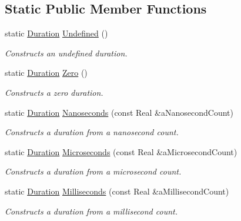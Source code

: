 \subsection*{Static Public Member Functions}
\begin{DoxyCompactItemize}
\item 
static \hyperlink{classostk_1_1physics_1_1time_1_1_duration}{Duration} \hyperlink{classostk_1_1physics_1_1time_1_1_duration_a568046182c0bc460b7e93de8b4084768}{Undefined} ()
\begin{DoxyCompactList}\small\item\em Constructs an undefined duration. \end{DoxyCompactList}\item 
static \hyperlink{classostk_1_1physics_1_1time_1_1_duration}{Duration} \hyperlink{classostk_1_1physics_1_1time_1_1_duration_acacd92afc598a3a48289307337fce217}{Zero} ()
\begin{DoxyCompactList}\small\item\em Constructs a zero duration. \end{DoxyCompactList}\item 
static \hyperlink{classostk_1_1physics_1_1time_1_1_duration}{Duration} \hyperlink{classostk_1_1physics_1_1time_1_1_duration_a81e8036be5cf9ee2f0108ac955642c96}{Nanoseconds} (const Real \&a\+Nanosecond\+Count)
\begin{DoxyCompactList}\small\item\em Constructs a duration from a nanosecond count. \end{DoxyCompactList}\item 
static \hyperlink{classostk_1_1physics_1_1time_1_1_duration}{Duration} \hyperlink{classostk_1_1physics_1_1time_1_1_duration_ab63d75db1524c35849385e07c0dc261a}{Microseconds} (const Real \&a\+Microsecond\+Count)
\begin{DoxyCompactList}\small\item\em Constructs a duration from a microsecond count. \end{DoxyCompactList}\item 
static \hyperlink{classostk_1_1physics_1_1time_1_1_duration}{Duration} \hyperlink{classostk_1_1physics_1_1time_1_1_duration_a0712e9c93f9be6ca4d837998fda90e7a}{Milliseconds} (const Real \&a\+Millisecond\+Count)
\begin{DoxyCompactList}\small\item\em Constructs a duration from a millisecond count. \end{DoxyCompactList}\item 

\end{DoxyCompactItemize}
